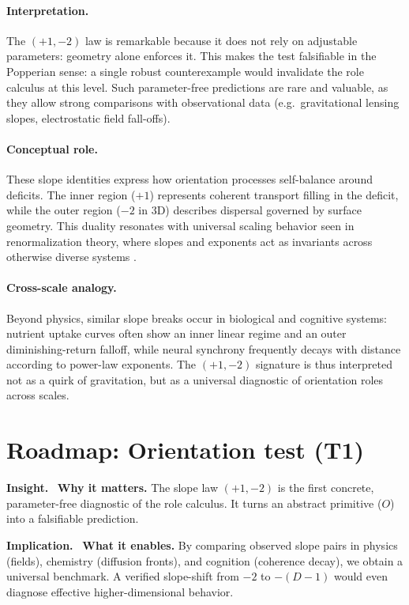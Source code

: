 \documentclass[12pt,a4paper,oneside]{scrreprt}
\newenvironment{insight}{\par\vspace{0.5em}\noindent\textbf{Insight.}\ }{\par\vspace{0.5em}}
\newenvironment{implication}{\par\vspace{0.5em}\noindent\textbf{Implication.}\ }{\par\vspace{0.5em}}
\begin{document}
\paragraph{Interpretation.} 
The $(+1,-2)$ law is remarkable because it does not rely on adjustable parameters: 
geometry alone enforces it. 
This makes the test falsifiable in the Popperian sense: a single robust counterexample 
would invalidate the role calculus at this level. 
Such parameter-free predictions are rare and valuable, as they allow strong comparisons 
with observational data (e.g.\ gravitational lensing slopes, electrostatic field fall-offs). 

\paragraph{Conceptual role.} 
These slope identities express how orientation processes self-balance around 
deficits. The inner region ($+1$) represents coherent transport filling in the deficit, 
while the outer region ($-2$ in 3D) describes dispersal governed by surface geometry. 
This duality resonates with universal scaling behavior seen in renormalization theory, 
where slopes and exponents act as invariants across otherwise diverse systems 
\citep{Wilson1971RG,Kadanoff1966}. 

\paragraph{Cross-scale analogy.} 
Beyond physics, similar slope breaks occur in biological and cognitive systems: 
nutrient uptake curves often show an inner linear regime and an outer diminishing-return falloff, 
while neural synchrony frequently decays with distance according to power-law exponents. 
The $(+1,-2)$ signature is thus interpreted not as a quirk of gravitation, 
but as a universal diagnostic of orientation roles across scales.

\section*{Roadmap: Orientation test (T1)}
\begin{insight}
\textbf{Why it matters.} 
The slope law $(+1,-2)$ is the first concrete, parameter-free diagnostic 
of the role calculus. 
It turns an abstract primitive ($O$) into a falsifiable prediction.
\end{insight}

\begin{implication}
\textbf{What it enables.} 
By comparing observed slope pairs in physics (fields), chemistry (diffusion fronts), 
and cognition (coherence decay), we obtain a universal benchmark. 
A verified slope-shift from $-2$ to $-(D-1)$ would even diagnose 
effective higher-dimensional behavior. 
\end{implication}
\end{document}
